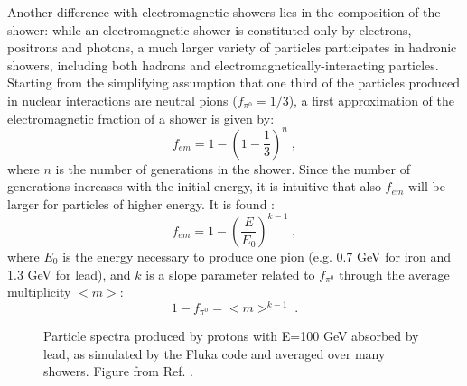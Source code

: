 Another difference with electromagnetic showers lies in the composition of the shower: while an electromagnetic shower is constituted only by electrons, positrons and photons, a much larger variety of particles participates in hadronic showers, including both hadrons and electromagnetically-interacting particles. Starting from the simplifying assumption that one third of the particles produced in nuclear interactions are neutral pions ($f_{\pi^0}=1/3$), a first approximation of the electromagnetic fraction of a shower is given by:
\begin{equation}
f_{em} = 1 - \left(1 - \frac{1}{3} \right)^n \; , \nonumber
\end{equation}
where $n$ is the number of generations in the shower. Since the number of generations increases with the initial energy, it is intuitive that also $f_{em}$ will be larger for particles of higher energy. It is found \cite{GABRIEL1994336}:
\begin{equation}
f_{em} = 1 - \left(\frac{E}{E_0}\right)^{k-1} \; , \nonumber
\end{equation}
where $E_0$ is the energy necessary to produce one pion (e.g. 0.7 GeV for iron and 1.3 GeV for lead), and $k$ is a slope parameter related to $f_{\pi^0}$ through the average multiplicity ${<}m{>}$:
\begin{equation}
1-f_{\pi^0} = {<}m{>}^{k-1} \;. \nonumber
\end{equation}


\begin{figure}[ht]
\centering
{}
\caption{Particle spectra produced by protons with E=100 GeV absorbed by lead, as simulated by the Fluka code \cite{Ferrari:898301} and averaged over many showers. Figure from Ref. \cite{RevModPhys.75.1243}.}
\label{fig:det:shower_had_spectra}
\end{figure}

